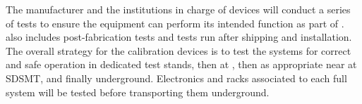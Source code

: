

The manufacturer and the institutions in charge of devices will conduct a series of tests to ensure the equipment can perform its intended function as part of .  also includes post-fabrication tests and tests run after shipping and installation. The overall strategy for the calibration devices is to test the systems for correct and safe operation in dedicated test stands, then at , then as appropriate near  at SDSMT, and finally underground. Electronics and racks associated to each full system will be tested before transporting them underground.

